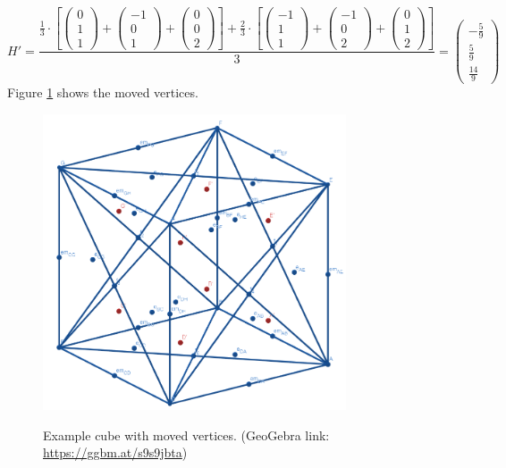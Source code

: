 \documentclass{article}
\begin{document}
\[H'=\frac{\frac{1}{3}\cdot\left[
\left({\begin{array}{c} 0 \\  1 \\ 1 \end{array}}\right)+
\left({\begin{array}{c} -1 \\  0 \\ 1 \end{array}}\right)+
\left({\begin{array}{c} 0 \\  0 \\ 2 \end{array}}\right)\right]+
\frac{2}{3}\cdot\left[
\left({\begin{array}{c} -1 \\  1 \\ 1 \end{array}}\right)+
\left({\begin{array}{c} -1 \\  0 \\ 2 \end{array}}\right)+
\left({\begin{array}{c} 0 \\  1 \\ 2 \end{array}}\right)\right]
}{3}=\left({\begin{array}{c} -\frac{5}{9} \\  \frac{5}{9} \\ \frac{14}{9} \end{array}}\right)\]
Figure \ref{fig:cube6} shows the moved vertices.
\begin{figure}[H]
\caption{Example cube with moved vertices. (GeoGebra link: \href{https://ggbm.at/s9s9jbta}{https://ggbm.at/s9s9jbta})}
\centering
\includegraphics[width=0.8\textwidth]{images/cl-06.png}
\label{fig:cube6}
\end{figure}
\end{document}
